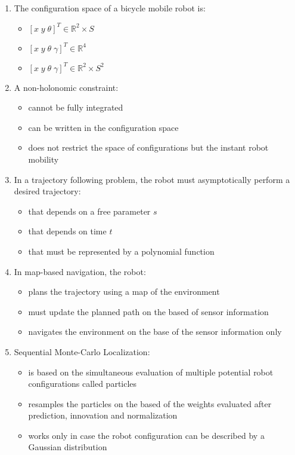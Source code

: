 \documentclass[openany]{book}
\newcommand{\R}{\mathbb{R}}
\theoremstyle{definition}
\theoremstyle{remark}
\begin{document}
\begin{enumerate}
    \item The configuration space of a bicycle mobile robot is:
    \begin{itemize}
        \item[] $[x\; y\; \theta]^T \in \R^2 \times S$
        \item[] $[x\; y\; \theta\; \gamma]^T \in \R^4$
        \item[\checkmark] $[x\; y\; \theta\; \gamma]^T \in \R^2 \times S^2$
    \end{itemize}

    \item A non-holonomic constraint:
    \begin{itemize}
        \item[\checkmark] cannot be fully integrated
        \item[] can be written in the configuration space
        \item[\checkmark] does not restrict the space of configurations but the instant robot mobility
    \end{itemize}

    \item In a trajectory following problem, the robot must asymptotically perform a desired trajectory:
    \begin{itemize}
        \item[\checkmark] that depends on a free parameter $s$
        \item[] that depends on time $t$
        \item[] that must be represented by a polynomial function
    \end{itemize}

    \item In map-based navigation, the robot:
    \begin{itemize}
        \item[\checkmark] plans the trajectory using a map of the environment
        \item[] must update the planned path on the based of sensor information
        \item[] navigates the environment on the base of the sensor information only
    \end{itemize}

    \item Sequential Monte-Carlo Localization:
    \begin{itemize}
        \item[\checkmark] is based on the simultaneous evaluation of multiple potential robot configurations called particles
        \item[\checkmark] resamples the particles on the based of the weights evaluated after prediction, innovation and normalization
        \item[] works only in case the robot configuration can be described by a Gaussian distribution
    \end{itemize}


\end{enumerate}
\end{document}

